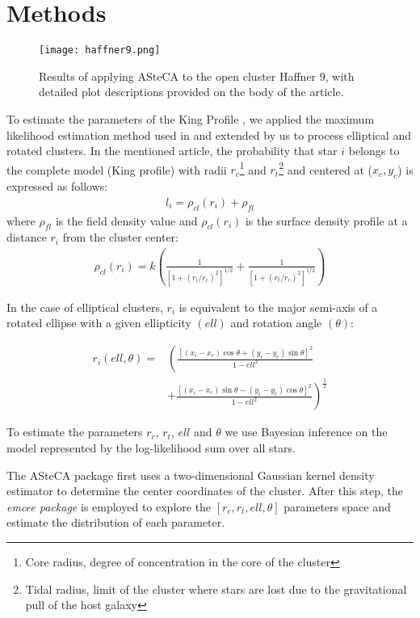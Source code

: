 \documentclass[baaa]{baaa}
\begin{document}
\section{Methods}
\begin{figure*}[h!]
    \centering
    \texttt{[image: haffner9.png]}
    \caption{Results of applying ASteCA to the open cluster Haffner 9, with detailed plot descriptions provided on the body of the article.}
    \label{haffner8}
\end{figure*}

To estimate the parameters of the King Profile \citep{1962AJ.....67..471K}, we applied the maximum likelihood estimation method used in \cite{2016MNRAS.461..519P} and extended by us to process elliptical and rotated clusters. In the mentioned article, the probability that star $i$ belongs to the complete model (King profile) with radii $r_c$\footnote{Core radius, degree of concentration in the core of the cluster} and $r_t$\footnote{Tidal radius, limit of the cluster where stars are lost due to the gravitational pull of the host galaxy} and centered at ($x_c, y_c$) is expressed as follows:
\begin{align}
    l_i = \rho_{cl}(r_i) + \rho_{fl}
\end{align}
where $\rho_{fl}$ is the field density value and $\rho_{cl}(r_i)$ is the surface density profile at a distance $r_i$ from the cluster center:
\begin{align}
    \rho_{cl}(r_i)=
    k\left(\frac{1}{\left[1+(r_i/r_c)^2\right]^{1/2}} + \frac{1}{\left[1+(r_t/r_c)^2\right]^{1/2}}\right)
    \label{2}
\end{align}

In the case of elliptical clusters, $r_i$ is equivalent to the major semi-axis of a rotated ellipse with a given ellipticity $(ell)$ and rotation angle $(\theta)$:

\begin{eqnarray}
    r_i(ell,\theta)=& \left( \frac{[(x_i-x_c)\cos{\theta} + (y_i-y_c)\sin{\theta}]^2}{1-ell^2} \right. \nonumber \\
    & + \left. \frac{[(x_i-x_c)\sin{\theta} - (y_i-y_c)\cos{\theta}]^2}{1-ell^2} \right)^{\frac{1}{2}}
\end{eqnarray}

To estimate the parameters $r_c$, $r_t$, $ell$ and $\theta$ we use Bayesian inference on the model represented by the log-likelihood sum over all stars.



The ASteCA package first uses a two-dimensional Gaussian kernel density estimator to determine the center coordinates of the cluster. After this step, the \textit{emcee package} \citep{2013PASP..125..306F} is employed to explore the $\left[r_c, r_t, ell, \theta\right]$ parameters space and estimate the distribution of each parameter.
\end{document}
